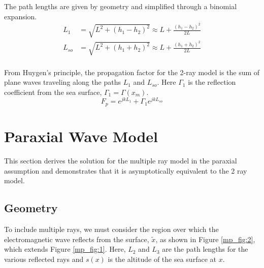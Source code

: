 The path lengths are given by geometry and simplified through a binomial expansion.
\begin{equation}
\begin{aligned}
L_1 & = \sqrt{L^2 + (h_1-h_2)^2}  \approx L + \frac{(h_1 - h_2)^2}{2L}\\
L_{so} & = \sqrt{L^2 + (h_1+h_2)^2}  \approx L + \frac{(h_1 + h_2)^2}{2L}\\
\end{aligned}
\label{mp_eq:1}
\end{equation}
\renewcommand{\baselinestretch}{2} \small\normalsize

From Huygen's principle, the propagation factor for the 2-ray model is the sum of plane waves traveling along the paths $L_1$ and $L_{so}$. Here $\Gamma_1$ is the reflection coefficient from the sea surface, $\Gamma_1 = \Gamma(x_m)$.
\begin{equation}
\boxed{F_p = e^{jkL_1} + \Gamma_1e^{jkL_{so}}}
\label{mp_eq:1b}
\end{equation}

\section{Paraxial Wave Model}
This section derives the solution for the multiple ray model in the paraxial assumption and demonstrates that it is asymptotically equivalent to the 2 ray model.

\subsection{Geometry}
To include multiple rays, we must consider the region over which the electromagnetic wave reflects from the surface, $\tilde{x}$, as shown in Figure \ref{mp_fig:2}, which extends Figure \ref{mp_fig:1}. Here, $L_2$ and $L_3$ are the path lengths for the various reflected rays and $s(x)$ is the altitude of the sea surface at $x$. 

